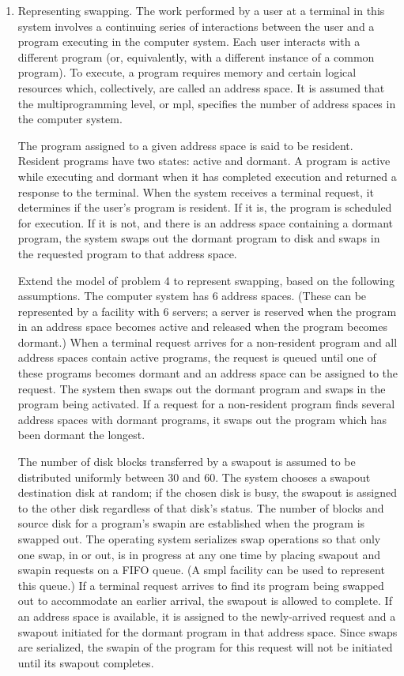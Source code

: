 \begin{enumerate}
\item Representing swapping. The work performed by a user at a terminal in
this system involves a continuing series of interactions between the user and a
program executing in the computer system. Each user interacts with a different
program (or, equivalently, with a different instance of a common program). To
execute, a program requires memory and certain logical resources which,
collectively, are called an address space. It is assumed that the
multiprogramming level, or mpl, specifies the number of address spaces in the
computer system.

The program assigned to a given address space is said to be resident.
Resident programs have two states: active and dormant. A program is active
while executing and dormant when it has completed execution and returned a
response to the terminal. When the system receives a terminal request, it
determines if the user's program is resident. If it is, the program is
scheduled for execution. If it is not, and there is an address space
containing a dormant program, the system swaps out the dormant program to disk
and swaps in the requested program to that address space.

Extend the model of problem 4 to represent swapping, based on the following
assumptions. The computer system has 6 address spaces. (These can be
represented by a facility with 6 servers; a server is reserved when the
program in an address space becomes active and released when the program
becomes dormant.) When a terminal request arrives for a non-resident program
and all address spaces contain active programs, the request is queued until one
of these programs becomes dormant and an address space can be assigned to the
request. The system then swaps out the dormant program and swaps in the
program being activated. If a request for a non-resident program finds several
address spaces with dormant programs, it swaps out the program which has been
dormant the longest.

The number of disk blocks transferred by a swapout is assumed to be
distributed uniformly between 30 and 60. The system chooses a swapout
destination disk at random; if the chosen disk is busy, the swapout is
assigned to the other disk regardless of that disk's status. The number of
blocks and source disk for a program's swapin are established when the
program is swapped out. The operating system serializes swap operations so
that only one swap, in or out, is in progress at any one time by placing
swapout and swapin requests on a FIFO queue. (A smpl facility can be used to
represent this queue.) If a terminal request arrives to find its program being
swapped out to accommodate an earlier arrival, the swapout is allowed to
complete. If an address space is available, it is assigned to the
newly-arrived request and a swapout initiated for the dormant program in that
address space. Since swaps are serialized, the swapin of the program for this
request will not be initiated until its swapout completes.


\end{enumerate}
